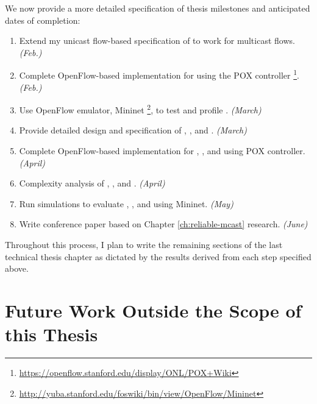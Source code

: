 We now provide a more detailed specification of thesis milestones and anticipated dates of completion:
\begin{enumerate}


	\item Extend my unicast flow-based specification of \fl to work for multicast flows.  \hfill {\it (Feb.)}
	
	\item Complete OpenFlow-based implementation for \fl using the POX controller \footnote{\url{https://openflow.stanford.edu/display/ONL/POX+Wiki}}. \hfill {\it (Feb.)}

	\item Use OpenFlow emulator, Mininet \footnote{\url{http://yuba.stanford.edu/foswiki/bin/view/OpenFlow/Mininet}}, to test and profile \fls. \hfill {\it (March)}

	\item Provide detailed design and specification of \mfs, \mds, and \mcs.  \hfill {\it (March)}
	
	\item Complete OpenFlow-based implementation for \mfs, \mds, and \mc using POX controller. \hfill {\it (April)}
	
	\item Complexity analysis of \mfs, \mds, and \mcs.  \hfill {\it (April)}

	\item Run simulations to evaluate \mfs, \mds, and \mc using Mininet. \hfill {\it (May)}

	\item Write conference paper based on Chapter \ref{ch:reliable-mcast} research. \hfill {\it (June)}


\end{enumerate}
Throughout this process, I plan to write the remaining sections of the last technical thesis chapter as dictated by the results derived from each step specified above. 

\section{Future Work Outside the Scope of this Thesis}
\label{sec:future-out-of-scope}

